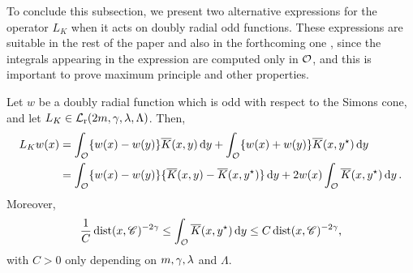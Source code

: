 To conclude this subsection, we present two alternative expressions for the operator $L_K$ when it acts on doubly radial odd functions. These expressions are suitable in the rest of the paper and also in the forthcoming one \cite{FelipeSanz-Perela:IntegroDifferentialII}, since the integrals appearing in the expression are computed only in $\mathcal{O}$, and this is important to prove maximum principle and other properties.

\begin{lemma}
	\label{Lemma:OperatorOddF}
	Let $w$ be a doubly radial function which is odd with respect to the Simons cone, and let $L_K \in \mathcal{L}_{\mathrm{r}}(2m,\gamma,\lambda, \Lambda)$. Then,
	\begin{align*}
	L_K w (x) &= \int_{\mathcal{O}} \{w(x) - w(y) \} \overline{K}(x, y) \,\mathrm{d} y +  \int_{\mathcal{O}} \{w(x) + w(y) \} \overline{K}(x, y^\star) \,\mathrm{d} y \\
	&= \int_{\mathcal{O}} \{w(x) - w(y) \} \{\overline{K}(x, y) - \overline{K}(x, y^\star)  \} \,\mathrm{d} y +  2 w(x) \int_{\mathcal{O}} \overline{K}(x, y^\star) \,\mathrm{d} y \,.
	\end{align*}
	Moreover,
	\begin{equation}
	\label{Eq:ZeroOrderTerm}
		\dfrac{1}{C} \operatorname{dist}(x,\mathscr{C})^{-2\gamma} \leq \int_{\mathcal{O}} \overline{K}(x, y^\star) \,\mathrm{d} y \leq C \operatorname{dist}(x,\mathscr{C})^{-2\gamma},
	\end{equation}
	with $C>0$ only depending on $m, \gamma, \lambda$ and $\Lambda$.
\end{lemma}

